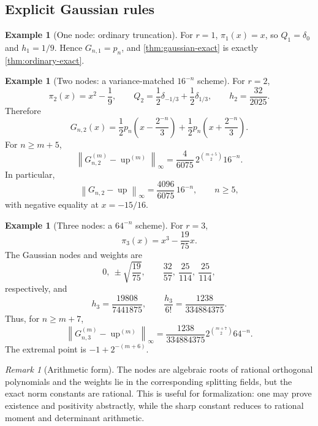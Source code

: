 \documentclass[11pt]{article}
\numberwithin{equation}{section}
\theoremstyle{definition}
\newtheorem{example}[theorem]{Example}
\theoremstyle{remark}
\newtheorem{remark}[theorem]{Remark}
\newcommand{\Up}{\operatorname{up}}
\newcommand{\norm}[1]{\left\lVert#1\right\rVert}
\begin{document}
\subsection{Explicit Gaussian rules}

\begin{example}[One node: ordinary truncation]
For $r=1$, $\pi_1(x)=x$, so $Q_1=\delta_0$ and $h_1=1/9$.  Hence $G_{n,1}=p_n$, and \cref{thm:gaussian-exact} is exactly \cref{thm:ordinary-exact}.
\end{example}

\begin{example}[Two nodes: a variance-matched $16^{-n}$ scheme]
For $r=2$,
\[
 \pi_2(x)=x^2-\frac19,
 \qquad
 Q_2=\frac12\delta_{-1/3}+\frac12\delta_{1/3},
 \qquad
 h_2=\frac{32}{2025}.
\]
Therefore
\begin{equation}
 \boxed{
 G_{n,2}(x)=\frac12p_n\!\left(x-\frac{2^{-n}}3\right)
 +\frac12p_n\!\left(x+\frac{2^{-n}}3\right).}
 \label{eq:Gn2}
\end{equation}
For $n\ge m+5$,
\begin{equation}
 \boxed{
 \norm{G_{n,2}^{(m)}-\Up^{(m)}}_\infty
 =\frac4{6075}\,2^{\binom{m+5}{2}}16^{-n}.}
 \label{eq:Gn2-error}
\end{equation}
In particular,
\begin{equation}
 \norm{G_{n,2}-\Up}_\infty
 =\frac{4096}{6075}\,16^{-n},
 \qquad n\ge5,
 \label{eq:Gn2-uniform}
\end{equation}
with negative equality at $x=-15/16$.
\end{example}

\begin{example}[Three nodes: a $64^{-n}$ scheme]
For $r=3$,
\[
 \pi_3(x)=x^3-\frac{19}{75}x.
\]
The Gaussian nodes and weights are
\begin{equation}
 0,\ \pm\sqrt{\frac{19}{75}},
 \qquad
 \frac{32}{57},\ \frac{25}{114},\ \frac{25}{114},
 \label{eq:G3-nodes-weights}
\end{equation}
respectively, and
\[
 h_3=\frac{19808}{7441875},
 \qquad
 \frac{h_3}{6!}=\frac{1238}{334884375}.
\]
Thus, for $n\ge m+7$,
\begin{equation}
 \boxed{
 \norm{G_{n,3}^{(m)}-\Up^{(m)}}_\infty
 =\frac{1238}{334884375}
 2^{\binom{m+7}{2}}64^{-n}.}
 \label{eq:Gn3-error}
\end{equation}
The extremal point is $-1+2^{-(m+6)}$.
\end{example}

\begin{remark}[Arithmetic form]
The nodes are algebraic roots of rational orthogonal polynomials and the weights lie in the corresponding splitting fields, but the exact norm constants are rational.  This is useful for formalization: one may prove existence and positivity abstractly, while the sharp constant reduces to rational moment and determinant arithmetic.
\end{remark}
\end{document}
